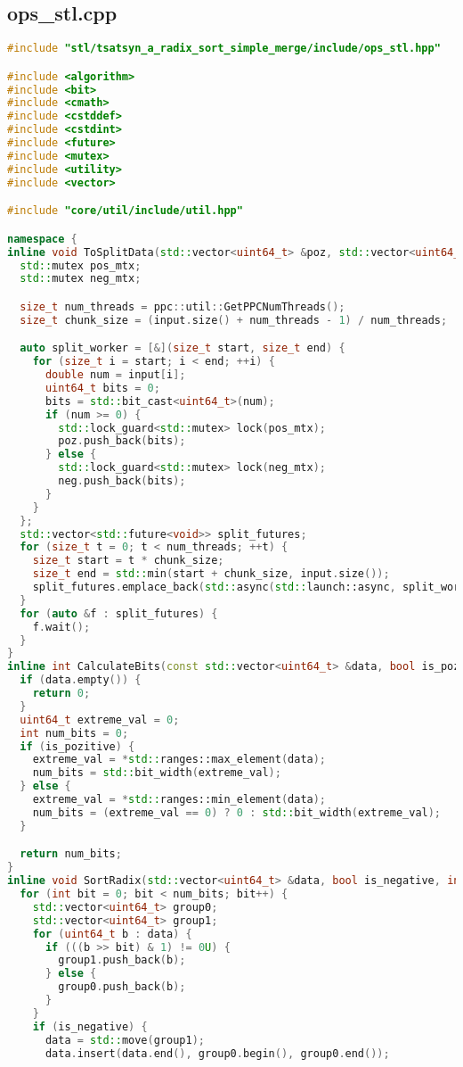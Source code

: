 \documentclass[a4paper,12pt]{article}
\begin{document}
\subsection{ops\_stl.cpp}
\begin{lstlisting}[language=C++,
    breaklines=true,       % Автоматический перенос строк
    basicstyle=\small\ttfamily, % Уменьшенный шрифт
    columns=fullflexible ]
    #include "stl/tsatsyn_a_radix_sort_simple_merge/include/ops_stl.hpp"

#include <algorithm>
#include <bit>
#include <cmath>
#include <cstddef>
#include <cstdint>
#include <future>
#include <mutex>
#include <utility>
#include <vector>

#include "core/util/include/util.hpp"

namespace {
inline void ToSplitData(std::vector<uint64_t> &poz, std::vector<uint64_t> &neg, std::vector<double> input) {
  std::mutex pos_mtx;
  std::mutex neg_mtx;

  size_t num_threads = ppc::util::GetPPCNumThreads();
  size_t chunk_size = (input.size() + num_threads - 1) / num_threads;

  auto split_worker = [&](size_t start, size_t end) {
    for (size_t i = start; i < end; ++i) {
      double num = input[i];
      uint64_t bits = 0;
      bits = std::bit_cast<uint64_t>(num);
      if (num >= 0) {
        std::lock_guard<std::mutex> lock(pos_mtx);
        poz.push_back(bits);
      } else {
        std::lock_guard<std::mutex> lock(neg_mtx);
        neg.push_back(bits);
      }
    }
  };
  std::vector<std::future<void>> split_futures;
  for (size_t t = 0; t < num_threads; ++t) {
    size_t start = t * chunk_size;
    size_t end = std::min(start + chunk_size, input.size());
    split_futures.emplace_back(std::async(std::launch::async, split_worker, start, end));
  }
  for (auto &f : split_futures) {
    f.wait();
  }
}
inline int CalculateBits(const std::vector<uint64_t> &data, bool is_pozitive) {
  if (data.empty()) {
    return 0;
  }
  uint64_t extreme_val = 0;
  int num_bits = 0;
  if (is_pozitive) {
    extreme_val = *std::ranges::max_element(data);
    num_bits = std::bit_width(extreme_val);
  } else {
    extreme_val = *std::ranges::min_element(data);
    num_bits = (extreme_val == 0) ? 0 : std::bit_width(extreme_val);
  }

  return num_bits;
}
inline void SortRadix(std::vector<uint64_t> &data, bool is_negative, int num_bits) {
  for (int bit = 0; bit < num_bits; bit++) {
    std::vector<uint64_t> group0;
    std::vector<uint64_t> group1;
    for (uint64_t b : data) {
      if (((b >> bit) & 1) != 0U) {
        group1.push_back(b);
      } else {
        group0.push_back(b);
      }
    }
    if (is_negative) {
      data = std::move(group1);
      data.insert(data.end(), group0.begin(), group0.end());


\end{lstlisting}
\end{document}
